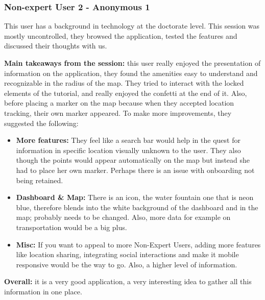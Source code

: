 \newpage

\subsubsection{Non-expert User 2 - Anonymous 1}
This user has a background in technology at the doctorate level. This session
was mostly uncontrolled, they browsed the application, tested the features and
discussed their thoughts with us.

\textbf{Main takeaways from the session: } this user really enjoyed the
presentation of information on the application, they found the amenities easy to
understand and recognizable in the radius of the map. They tried to interact
with the locked elements of the tutorial, and really enjoyed the confetti at the
end of it. Also, before placing a marker on the map because when they accepted
location tracking, their own marker appeared. To make more improvements, they
suggested the following:
\begin{itemize}
    \item \textbf{More features: }They feel like a search bar would help in the
          quest for information in specific location visually unknown to the user.
          They also though the points would appear automatically on the map but
          instead she had to place her own marker. Perhaps there is an issue with
          onboarding not being retained.
          \vspace{0.2cm}
          
    \item \textbf{Dashboard \& Map: }There is an icon, the water fountain one
          that is neon blue, therefore blends into the white background of the
          dashboard and in the map; probably needs to be changed. Also, more data for
          example on transportation would be a big plus.
          \vspace{0.2cm}
          
    \item \textbf{Misc: } If you want to appeal to more Non-Expert Users, adding
          more features like location sharing, integrating social interactions and
          make it mobile responsive would be the way to go. Also, a higher level of
          information.
\end{itemize}
\textbf{Overall: }it is a very good application, a very interesting idea to
gather all this information in one place.

